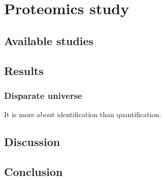 \chapter{Proteomics study}
\label{sec:proteomics}

\section{Available studies}
\section{Results}
    \subsection{Disparate universe}
    It is more about identification than quantification.
\section{Discussion}
\section{Conclusion}


